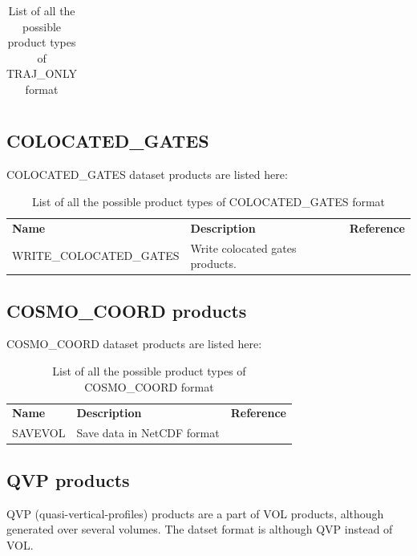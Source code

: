 \documentclass[a4paper,11pt,pdftex,twoside]{scrartcl}
\renewcommand{\bf}{\normalfont \bfseries}
\begin{document}
{{{\begin{table}[H]
\begin{tabularx}{\textwidth}{lXl}
\end{tabularx}
\caption{List of all the possible product types of TRAJ\_ONLY format}
\label{tab_products_TRAJ_ONLY}
\end{table}

\subsection{COLOCATED\_GATES}
COLOCATED\_GATES dataset products are listed here:

\begin{table}[H]
\begin{tabularx}{\textwidth}{lXl}
{\bf Name} & {\bf Description} & {\bf Reference}\\
 WRITE\_COLOCATED\_GATES & Write colocated gates products. &  \\
\end{tabularx}
\caption{List of all the possible product types of COLOCATED\_GATES format}
\label{tab_products_COLOCATED_GATES}
\end{table}



\subsection{COSMO\_COORD products}
COSMO\_COORD dataset products are listed here:

\begin{table}[H]
\begin{tabularx}{\textwidth}{lXl}
{\bf Name} & {\bf Description} & {\bf Reference}\\
 SAVEVOL & Save data in NetCDF format &  \\
\end{tabularx}
\caption{List of all the possible product types of COSMO\_COORD format}
\label{tab_products_COSMO_COORD}
\end{table}


\subsection{QVP products}
QVP (quasi-vertical-profiles) products are a part of VOL products, although generated over several volumes. The datset format is although QVP instead of VOL.

\newpage
\newpage
\newpage




}}}
\end{document}
